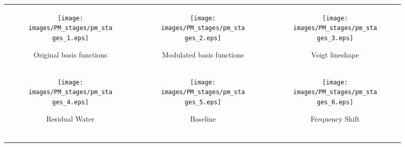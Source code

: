 \begin{figure}
    \centering
    \begin{tabular}[l]{ccc}
    \begin{subfigure}[c]{0.315\textwidth}
        \texttt{[image: images/PM\_stages/pm\_stages\_1.eps]}
        \caption{Original basis functions}
        \label{fig:PM_stages:basis functions}\vspace{0.2\baselineskip}
    \end{subfigure}&
    \begin{subfigure}[c]{0.315\textwidth}
        \texttt{[image: images/PM\_stages/pm\_stages\_2.eps]}
        \caption{Modulated basis functions}
        \label{fig:PM_stages:modulated}\vspace{0.2\baselineskip}
    \end{subfigure}&
    \begin{subfigure}[c]{0.315\textwidth}
        \texttt{[image: images/PM\_stages/pm\_stages\_3.eps]}
        \caption{Voigt lineshape}
        \label{fig:PM_stages:B0 inhomogeneities}\vspace{0.2\baselineskip}
    \end{subfigure}\\[25pt]
    \begin{subfigure}[c]{0.315\textwidth}
        \texttt{[image: images/PM\_stages/pm\_stages\_4.eps]}
        \caption{Residual Water}
        \label{fig:PM_stages:lineshape}\vspace{0.2\baselineskip}
    \end{subfigure}&
    \begin{subfigure}[c]{0.315\textwidth}
        \texttt{[image: images/PM\_stages/pm\_stages\_5.eps]}
        \caption{Baseline}
        \label{fig:PM_stages:phi1}\vspace{0.2\baselineskip}
    \end{subfigure}&
    \begin{subfigure}[c]{0.315\textwidth}
        \texttt{[image: images/PM\_stages/pm\_stages\_6.eps]}
        \caption{Frequency Shift}
        \label{fig:PM_stages:phi0}\vspace{0.2\baselineskip}\vspace{0.2\baselineskip}
    \end{subfigure}\\[25pt]
    \begin{subfigure}[c]{0.315\textwidth}

\end{subfigure}
\end{tabular}
\end{figure}
